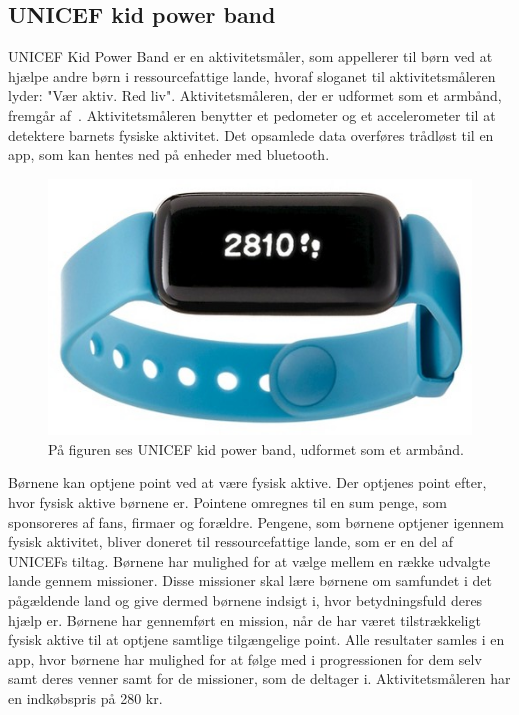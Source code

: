 \subsection{UNICEF kid power band}
UNICEF Kid Power Band er en aktivitetsmåler, som appellerer til børn ved at hjælpe andre børn i ressourcefattige lande, hvoraf sloganet til aktivitetsmåleren lyder: "Vær aktiv. Red liv".
Aktivitetsmåleren, der er udformet som et armbånd, fremgår af~. Aktivitetsmåleren benytter et pedometer og et accelerometer til at detektere barnets fysiske aktivitet. Det opsamlede data overføres trådløst til en app, som kan hentes ned på enheder med bluetooth. \citep{PowerAbout2015,PowerManual2015}

\begin{figure}[H]
	\centering
	\includegraphics[scale=0.55]{figures/aProblemanalyse/unicef.png}
	\caption{På figuren ses UNICEF kid power band, udformet som et armbånd. \cite{Unicef2016}}
	\label{fig:unicef}
\end{figure}
Børnene kan optjene point ved at være fysisk aktive. Der optjenes point efter, hvor fysisk aktive børnene er. Pointene omregnes til en sum penge, som sponsoreres af fans, firmaer og forældre. Pengene, som børnene optjener igennem fysisk aktivitet, bliver doneret til ressourcefattige lande, som er en del af UNICEFs tiltag. %
Børnene har mulighed for at vælge mellem en række udvalgte lande gennem missioner. Disse missioner skal lære børnene om samfundet i det pågældende land og give dermed børnene indsigt i, hvor betydningsfuld deres hjælp er. Børnene har gennemført en mission, når de har været tilstrækkeligt fysisk aktive til at optjene samtlige tilgængelige point. Alle resultater samles i en app, hvor børnene har mulighed for at følge med i progressionen for dem selv samt deres venner samt for de missioner, som de deltager i. Aktivitetsmåleren har en indkøbspris på 280 kr. \citep{PowerAbout2015,PowerManual2015}


